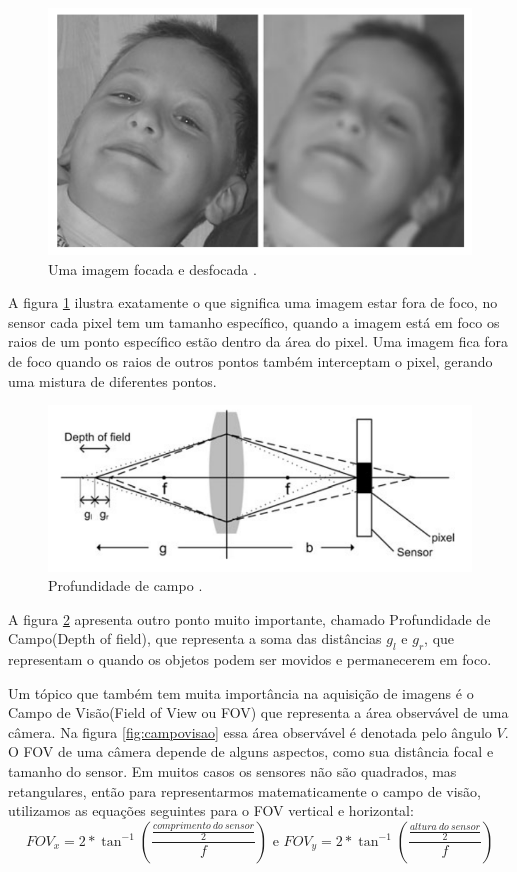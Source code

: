 \documentclass[
  brazilian,
]{book}
\begin{document}
\begin{figure}

{\centering \includegraphics[width=0.55\linewidth]{imagens/02-formacao/foco} 

}

\caption{Uma imagem focada e desfocada \autocite[p.11]{moeslund2012}.}\label{fig:foco}
\end{figure}

A figura \ref{fig:foco} ilustra exatamente o que significa uma imagem estar fora de foco, no sensor cada pixel tem um tamanho específico, quando a imagem está em foco os raios de um ponto específico estão dentro da área do pixel. Uma imagem fica fora de foco quando os raios de outros pontos também interceptam o pixel, gerando uma mistura de diferentes pontos.



\begin{figure}

{\centering \includegraphics[width=0.55\linewidth]{imagens/02-formacao/profundidade} 

}

\caption{Profundidade de campo \autocite[p.13]{moeslund2012}.}\label{fig:profundidade}
\end{figure}

A figura \ref{fig:profundidade} apresenta outro ponto muito importante, chamado Profundidade de Campo(Depth of field), que representa a soma das distâncias \(g_l\) e \(g_r\), que representam o quando os objetos podem ser movidos e permanecerem em foco.

Um tópico que também tem muita importância na aquisição de imagens é o Campo de Visão(Field of View ou FOV) que representa a área observável de uma câmera. Na figura \ref{fig:campovisao} essa área observável é denotada pelo ângulo \(V\). O FOV de uma câmera depende de alguns aspectos, como sua distância focal e tamanho do sensor. Em muitos casos os sensores não são quadrados, mas retangulares, então para representarmos matematicamente o campo de visão, utilizamos as equações seguintes para o FOV vertical e horizontal:
\[FOV_x = 2*\tan^{-1}\left(\frac{\frac{comprimento\ do\ sensor}{2}}{f}\right) \text{ e }  FOV_y = 2*\tan^{-1}\left(\frac{\frac{altura\ do\ sensor}{2}}{f}\right)\]
\end{document}
